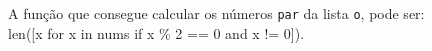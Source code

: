 \documentclass[12pt,varwidth=16cm,border=1pt]{standalone}
\begin{document}
A função que consegue calcular os números \verb+par+ da lista \verb+o+, pode ser: \\ len([x for x in nums if x \% 2 == 0 and x != 0]).

\questiomtrue
\end{document}
